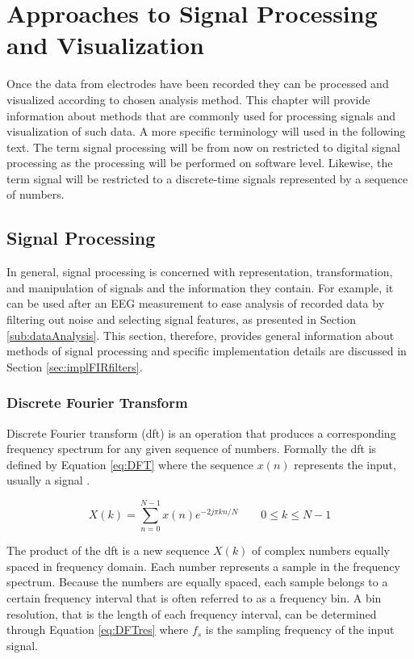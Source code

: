 \chapter{Approaches to Signal Processing and Visualization} \label{appProcVis}
Once the data from electrodes have been recorded they can be processed and visualized according to chosen analysis method. This chapter will provide information about methods that are commonly used for processing signals and visualization of such data. A more specific terminology will used in the following text. The term signal processing will be from now on restricted to digital signal processing as the processing will be performed on software level. Likewise, the term signal will be restricted to a discrete-time signals represented by a sequence of numbers. 

\section{Signal Processing} \label{sec:sigProc}
In general, signal processing is concerned with representation, transformation, and manipulation of signals and the information they contain. For example, it can be used after an EEG measurement to ease analysis of recorded data by filtering out noise and selecting signal features, as presented in Section \ref{sub:dataAnalysis}. This section, therefore, provides general information about
methods of signal processing and specific implementation details are discussed in Section \ref{sec:implFIRfilters}. 

\subsection{Discrete Fourier Transform}
Discrete Fourier transform (\gls{dft}) is an operation that produces a corresponding frequency spectrum for any given sequence of numbers. Formally the \gls{dft} is defined by Equation \ref{eq:DFT} where the sequence $x(n)$ represents the input, usually a signal \cite[p. 401]{DSP3}. 

\begin{equation}
\label{eq:DFT}
	X(k) = \sum\limits_{n=0}^{N - 1}x(n)e^{-2 j \pi k n /N} \qquad 0 \leq k \leq N-1
\end{equation}

The product of the \gls{dft} is a new sequence $X(k)$ of complex numbers equally spaced in frequency domain. Each number represents a sample in the frequency spectrum. Because the numbers are equally spaced, each sample belongs to a certain frequency interval that is often referred to as a frequency bin. A bin resolution, that is the length of each frequency interval, can be determined through Equation \ref{eq:DFTres} where $f_s$ is the sampling frequency of the input signal. 

